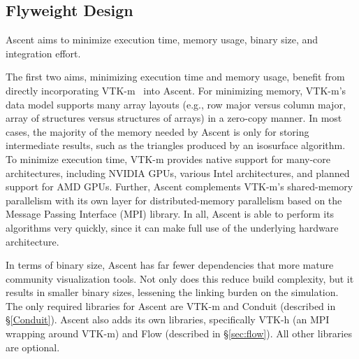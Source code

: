 \documentclass[graybox]{svmult}
\newcommand{\fix}[1]{\textcolor{red}{#1}} %
\begin{document}
\subsection{Flyweight Design}

Ascent aims to minimize execution time, memory usage, binary size, and integration effort.

The first two aims, minimizing execution time and memory usage, benefit from directly
incorporating VTK-m~\cite{Moreland:CGA2016} into Ascent.
%
For minimizing memory,
VTK-m's data model supports many array layouts (e.g., row major versus
column major, array of structures versus structures of arrays)
in a zero-copy manner.
%
In most cases, the majority of the memory needed by Ascent is only for
storing intermediate results, such as the triangles produced by an isosurface algorithm.
%
To minimize execution time,
VTK-m provides native support for many-core architectures,
including NVIDIA GPUs, various Intel architectures,
and planned support for AMD GPUs.
%
Further, Ascent complements VTK-m's shared-memory parallelism with
its own layer for distributed-memory parallelism based on the
Message Passing Interface (MPI) library.
%
In all, Ascent is able to perform its algorithms very quickly,
since it can make full use of the underlying hardware architecture.
%

In terms of binary size, Ascent has far 
fewer dependencies that more mature community visualization tools.
%
Not only does this reduce build complexity, but it results in
smaller binary sizes, lessening the linking burden on the simulation.
%
The only required libraries for Ascent are VTK-m
and Conduit (described in \S\ref{Conduit}).
%
Ascent also adds its own libraries, specifically VTK-h (an MPI wrapping around
VTK-m) and Flow (described in \S\ref{sec:flow}).
%
All other libraries are optional.
\end{document}
